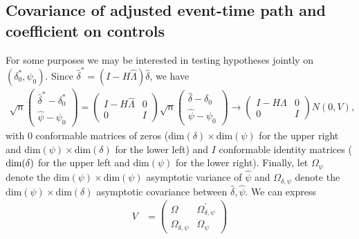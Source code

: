 \documentclass[12pt]{article}
\begin{document}
\subsection{Covariance of adjusted event-time path and coefficient on controls}

For some purposes we may be interested in testing hypotheses jointly on $\left(\delta_{0}^{*},\psi_{0}\right)$.
Since $\widehat{\delta}^{*}=(I-H\widehat{\Lambda})\widehat{\delta}$, we have
\begin{align*}
\sqrt{n}\begin{pmatrix}\widehat{\delta}^{*}-\delta_{0}^{*}\\
\widehat{\psi}-\psi_{0}
\end{pmatrix}=\begin{pmatrix}I-H\widehat{\Lambda} & 0\\
0 & I
\end{pmatrix}\sqrt{n}\begin{pmatrix}\widehat{\delta}-\delta_{0}\\
\widehat{\psi}-\psi_{0}
\end{pmatrix}\to\begin{pmatrix}I-H\Lambda & 0\\
0 & I
\end{pmatrix}N(0,V),
\end{align*}
with $0$ conformable matrices of zeros ($\text{dim}(\delta)\times\text{dim}(\psi)$
for the upper right and $\text{dim}(\psi)\times\text{dim}(\delta)$
for the lower left) and $I$ conformable identity matrices ($\text{dim\ensuremath{\left(\delta\right)}}$
for the upper left and $\text{dim}\left(\psi\right)$ for the lower
right). Finally, let $\Omega_{\psi}$ denote the $\text{dim}(\psi)\times\text{dim}(\psi)$
asymptotic variance of $\widehat{\psi}$ and $\Omega_{\delta,\psi}$
denote the $\text{dim}(\psi)\times\text{dim}(\delta)$ asymptotic
covariance between $\widehat{\delta},\widehat{\psi}$. We can express
\begin{align*}
V & =\begin{pmatrix}\Omega & \Omega_{\delta,\psi}^{\prime}\\
\Omega_{\delta,\psi} & \Omega_{\psi}
\end{pmatrix}
\end{align*}
\end{document}

